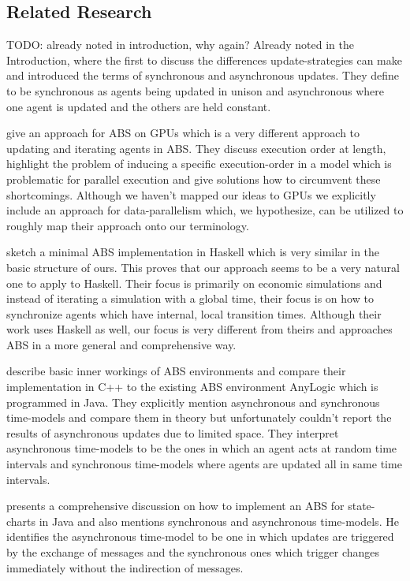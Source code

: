 \subsection{Related Research}
TODO: already noted in introduction, why again?
Already noted in the Introduction, \cite{huberman_evolutionary_1993} where the first to discuss the differences update-strategies can make and introduced the terms of synchronous and asynchronous updates. They define to be synchronous as agents being updated in unison and asynchronous where one agent is updated and the others are held constant.

\medskip

\cite{a_framework_2008} give an approach for ABS on GPUs which is a very different approach to updating and iterating agents in ABS. They discuss execution order at length, highlight the problem of inducing a specific execution-order in a model which is problematic for parallel execution and give solutions how to circumvent these shortcomings. Although we haven't mapped our ideas to GPUs we explicitly include an approach for data-parallelism which, we hypothesize, can be utilized to roughly map their approach onto our terminology. 
	
\medskip
	
\cite{botta_time_2010} sketch a minimal ABS implementation in Haskell which is very similar in the basic structure of ours. This proves that our approach seems to be a very natural one to apply to Haskell. Their focus is primarily on economic simulations and instead of iterating a simulation with a global time, their focus is on how to synchronize agents which have internal, local transition times. Although their work uses Haskell as well, our focus is very different from theirs and approaches ABS in a more general and comprehensive way.

\medskip

\cite{dawson_opening_2014} describe basic inner workings of ABS environments and compare their implementation in C++ to the existing ABS environment AnyLogic which is programmed in Java. They explicitly mention asynchronous and synchronous time-models and compare them in theory but unfortunately couldn't report the results of asynchronous updates due to limited space. They interpret asynchronous time-models to be the ones in which an agent acts at random time intervals and synchronous time-models where agents are updated all in same time intervals.

\medskip

\cite{yuxuan_agent-based_2016} presents a comprehensive discussion on how to implement an ABS for state-charts in Java and also mentions synchronous and asynchronous time-models. He identifies the asynchronous time-model to be one in which updates are triggered by the exchange of messages and the synchronous ones which trigger changes immediately without the indirection of messages.

